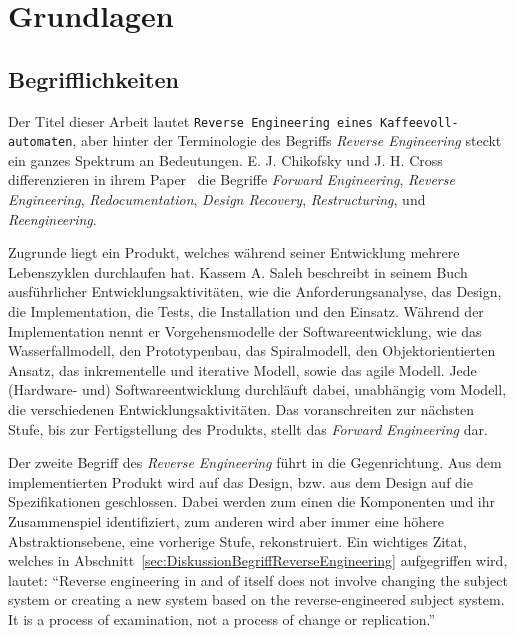\chapter{Grundlagen}

\section{Begrifflichkeiten}\label{sec:Begrifflichkeiten}
Der Titel dieser Arbeit lautet \texttt{Reverse Engineering eines Kaffeevoll-\\automaten}, aber hinter der Terminologie des Begriffs \textit{Reverse Engineering} steckt ein ganzes Spektrum an Bedeutungen.
E. J. Chikofsky und J. H. Cross differenzieren in ihrem Paper~\cite{43044} die Begriffe \textit{Forward Engineering}, \textit{Reverse Engineering}, \textit{Redocumentation}, \textit{Design Recovery}, \textit{Restructuring}, und \textit{Reengineering}.

Zugrunde liegt ein Produkt, welches während seiner Entwicklung mehrere Lebenszyklen durchlaufen hat.
Kassem A. Saleh beschreibt in seinem Buch~\cite{Solr-599853700} ausführlicher Entwicklungsaktivitäten, wie die Anforderungsanalyse, das Design, die Implementation, die Tests, die Installation und den Einsatz.
Während der Implementation nennt er Vorgehensmodelle der Softwareentwicklung, wie das Wasserfallmodell, den Prototypenbau, das Spiralmodell, den Objektorientierten Ansatz, das inkrementelle und iterative Modell, sowie das agile Modell.
Jede (Hardware- und) Softwareentwicklung durchläuft dabei, unabhängig vom Modell, die verschiedenen Entwicklungsaktivitäten.
Das voranschreiten zur nächsten Stufe, bis zur Fertigstellung des Produkts, stellt das \textit{Forward Engineering} dar.

Der zweite Begriff des \textit{Reverse Engineering} führt in die Gegenrichtung.
Aus dem implementierten Produkt wird auf das Design, bzw. aus dem Design auf die Spezifikationen geschlossen.
Dabei werden zum einen die Komponenten und ihr Zusammenspiel identifiziert, zum anderen wird aber immer eine höhere Abstraktionsebene, eine vorherige Stufe, rekonstruiert.
Ein wichtiges Zitat, welches in Abschnitt~\ref{sec:DiskussionBegriffReverseEngineering}  aufgegriffen wird, lautet: "`Reverse engineering in and of itself does not involve changing the subject system or creating a new system based on the reverse-engineered subject system.
It is a process of examination, not a process of change or replication."'\cite{43044}

